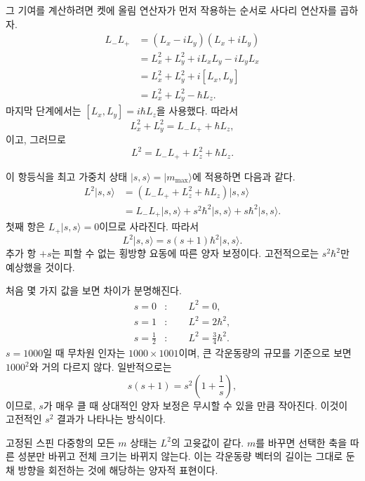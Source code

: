 그 기여를 계산하려면 켓에 올림 연산자가 먼저 작용하는 순서로 사다리 연산자를 곱하자.\begin{align}
L_-L_+
&=(L_x-iL_y)(L_x+iL_y) \\
&=L_x^2+L_y^2+iL_xL_y-iL_yL_x \\
&=L_x^2+L_y^2+i[L_x,L_y] \\
&=L_x^2+L_y^2-\hbar L_z.
\end{align}마지막 단계에서는 \([L_x,L_y]=i\hbar L_z\)을 사용했다. 따라서\begin{equation}
L_x^2+L_y^2=L_-L_++\hbar L_z,
\end{equation}이고, 그러므로\begin{equation}
L^2=L_-L_++L_z^2+\hbar L_z.
\end{equation}

이 항등식을 최고 가중치 상태 \(\lvert s,s\rangle=\lvert m_{\max}\rangle\)에 적용하면 다음과 같다.
\begin{align}
L^2\lvert s,s\rangle
&=\left(L_-L_++L_z^2+\hbar L_z\right)\lvert s,s\rangle \\
&=L_-L_+\lvert s,s\rangle
+s^2\hbar^2\lvert s,s\rangle
+s\hbar^2\lvert s,s\rangle.
\end{align}
첫째 항은 \(L_+\lvert s,s\rangle=0\)이므로 사라진다. 따라서
\begin{equation}
L^2\lvert s,s\rangle
=s(s+1)\hbar^2\lvert s,s\rangle.
\end{equation}
추가 항 \(+s\)는 피할 수 없는 횡방향 요동에 따른 양자 보정이다. 고전적으로는 \(s^2\hbar^2\)만 예상했을 것이다.

처음 몇 가지 값을 보면 차이가 분명해진다.\begin{align}
s=0 &: \qquad L^2=0,\\
s=1 &: \qquad L^2=2\hbar^2,\\
s=\frac12 &: \qquad L^2=\frac34\hbar^2.
\end{align}\(s=1000\)일 때 무차원 인자는 \(1000\times1001\)이며, 큰 각운동량의 규모를 기준으로 보면 \(1000^2\)와 거의 다르지 않다. 일반적으로는\begin{equation}
s(s+1)=s^2\left(1+\frac1s\right),
\end{equation}이므로, \(s\)가 매우 클 때 상대적인 양자 보정은 무시할 수 있을 만큼 작아진다. 이것이 고전적인 \(s^2\) 결과가 나타나는 방식이다.

고정된 스핀 다중항의 모든 \(m\) 상태는 \(L^2\)의 고윳값이 같다. \(m\)를 바꾸면 선택한 축을 따른 성분만 바뀌고 전체 크기는 바뀌지 않는다. 이는 각운동량 벡터의 길이는 그대로 둔 채 방향을 회전하는 것에 해당하는 양자적 표현이다.

